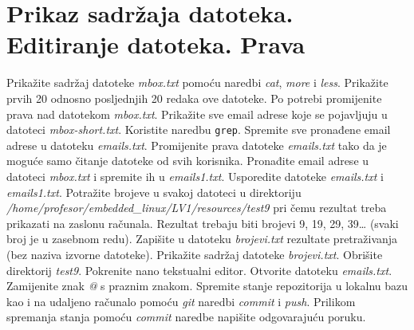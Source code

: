 \documentclass[11pt]{article}
\begin{document}
\section{Prikaz sadržaja datoteka. Editiranje datoteka. Prava}
Prikažite sadržaj datoteke \textit{mbox.txt} pomoću naredbi \textit{cat},
 \textit{more} i \textit{less}. Prikažite prvih 20 odnosno posljednjih 20
 redaka ove datoteke. Po potrebi promijenite prava nad datotekom
 \textit{mbox.txt}.
\newline
\newline
Prikažite sve email adrese koje se pojavljuju u datoteci
\textit{mbox-short.txt}. Koristite naredbu \texttt{grep}.
Spremite sve pronađene email adrese u datoteku
 \textit{emails.txt}. Promijenite prava datoteke \textit{emails.txt} tako da je
 moguće samo čitanje datoteke od svih korisnika.
\newline
\newline
Pronađite email adrese u datoteci \textit{mbox.txt} i spremite ih u
 \textit{emails1.txt}. Usporedite datoteke \textit{emails.txt} i
 \textit{emails1.txt}. Potražite brojeve u svakoj datoteci u direktoriju \\
 \textit{/home/profesor/embedded\_linux/LV1/resources/test9} pri čemu rezultat
 treba prikazati na zaslonu računala. Rezultat trebaju biti brojevi 9, 19, 29,
 39… (svaki broj je u zasebnom redu). Zapišite u datoteku \textit{brojevi.txt}
 rezultate pretraživanja (bez naziva izvorne datoteke). Prikažite sadržaj
 datoteke \textit{brojevi.txt}. Obrišite direktorij \textit{test9}.
\newline
\newline
Pokrenite nano tekstualni editor. Otvorite datoteku \textit{emails.txt}.
 Zamijenite znak \textit{@} s praznim znakom.
\newline
\newline
Spremite stanje repozitorija u lokalnu bazu kao i na udaljeno računalo pomoću
 \textit{git} naredbi \textit{commit} i \textit{push}. Prilikom spremanja
 stanja pomoću \textit{commit} naredbe napišite odgovarajuću poruku.
\end{document}
